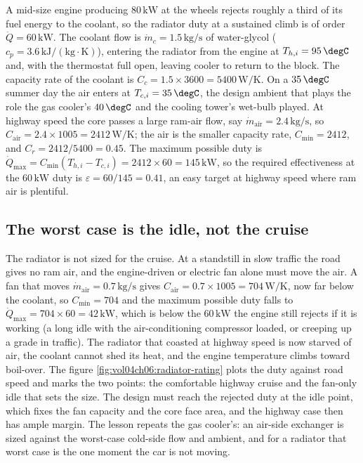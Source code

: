 A mid-size engine producing $80\,\text{kW}$ at the wheels rejects roughly a third
of its fuel energy to the coolant, so the radiator duty at a sustained climb is of
order $\dot{Q} = 60\,\text{kW}$. The coolant flow is $\dot{m}_c = 1.5\,\text{kg/s}$
of water-glycol ($c_p = 3.6\,\text{kJ}/(\text{kg}\cdot\si{\kelvin})$), entering the
radiator from the engine at $T_{h,i} = 95\,\degC$ and, with the thermostat full
open, leaving cooler to return to the block. The capacity rate of the coolant is
$C_c = 1.5\times 3600 = 5400\,\si{\watt\per\kelvin}$. On a $35\,\degC$ summer day
the air enters at $T_{c,i} = 35\,\degC$, the design ambient that plays the role the
gas cooler's $40\,\degC$ and the cooling tower's wet-bulb played. At highway speed
the core passes a large ram-air flow, say $\dot{m}_{\text{air}} = 2.4\,\text{kg/s}$,
so $C_{\text{air}} = 2.4\times 1005 = 2412\,\si{\watt\per\kelvin}$; the air is the
smaller capacity rate, $C_{\min} = 2412$, and $C_r = 2412/5400 = 0.45$. The maximum
possible duty is $\dot{Q}_{\max} = C_{\min}(T_{h,i} - T_{c,i}) = 2412\times 60 =
145\,\text{kW}$, so the required effectiveness at the $60\,\text{kW}$ duty is
$\varepsilon = 60/145 = 0.41$, an easy target at highway speed where ram air is
plentiful.

\subsection{The worst case is the idle, not the cruise}

The radiator is not sized for the cruise. At a standstill in slow traffic the road
gives no ram air, and the engine-driven or electric fan alone must move the air. A
fan that moves $\dot{m}_{\text{air}} = 0.7\,\text{kg/s}$ gives $C_{\text{air}} =
0.7\times 1005 = 704\,\si{\watt\per\kelvin}$, now far below the coolant, so
$C_{\min} = 704$ and the maximum possible duty falls to $\dot{Q}_{\max} = 704\times
60 = 42\,\text{kW}$, which is below the $60\,\text{kW}$ the engine still rejects if
it is working (a long idle with the air-conditioning compressor loaded, or creeping
up a grade in traffic). The radiator that coasted at highway speed is now starved of
air, the coolant cannot shed its heat, and the engine temperature climbs toward
boil-over. The figure \ref{fig:vol04ch06:radiator-rating} plots the duty against
road speed and marks the two points: the comfortable highway cruise and the
fan-only idle that sets the size. The design must reach the rejected duty at the
idle point, which fixes the fan capacity and the core face area, and the highway
case then has ample margin. The lesson repeats the gas cooler's: an air-side
exchanger is sized against the worst-case cold-side flow and ambient, and for a
radiator that worst case is the one moment the car is not moving.

